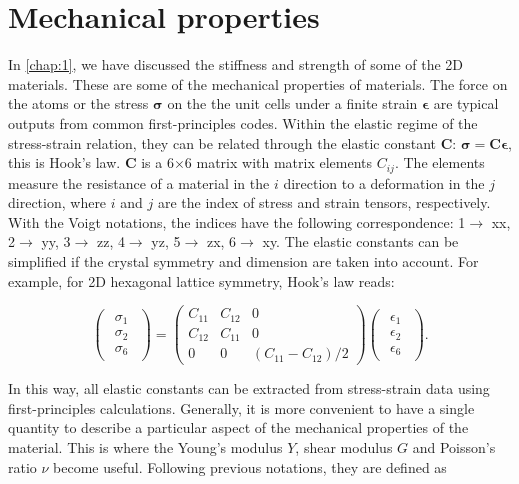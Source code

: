 \section{Mechanical properties}

In \autoref{chap:1}, we have discussed the stiffness and strength of some of the 2D materials. These are some of the mechanical properties of materials. The force on the atoms or the stress $\boldsymbol{\sigma}$ on the the unit cells under a finite strain $\boldsymbol{\epsilon}$ are typical outputs from common first-principles codes. Within the elastic regime of the stress-strain relation, they can be related through the elastic constant $\boldsymbol{C}$: $\boldsymbol{\sigma}=\boldsymbol{C}\boldsymbol{\epsilon}$, this is Hook's law. $\boldsymbol{C}$ is a 6$\times$6 matrix with matrix elements $C_{ij}$. The elements measure the resistance of a material in the $i$ direction to a deformation in the $j$ direction, where $i$ and $j$ are the index of stress and strain tensors, respectively.  With the Voigt notations, the indices have the following correspondence: 1$\rightarrow$ xx, 2$\rightarrow$ yy, 3$\rightarrow$ zz, 4$\rightarrow$ yz, 5$\rightarrow$ zx, 6$\rightarrow$ xy. The elastic constants can be simplified if the crystal symmetry and dimension are taken into account. For example, for 2D hexagonal lattice symmetry, Hook's law reads:

\begin{equation}
\begin{pmatrix} \begin{array}{c} \sigma_1 \\ \sigma_2 \\ \sigma_6 \end{array} 
\end{pmatrix}
=
 \begin{pmatrix}
  C_{11} & C_{12} & 0  \\
  C_{12} & C_{11} & 0  \\
  0 & 0 & (C_{11}-C_{12})/2
 \end{pmatrix}
 \begin{pmatrix} \begin{array}{c} \epsilon_1 \\ \epsilon_2 \\ \epsilon_6 
\end{array} \end{pmatrix}.
\end{equation} 

In this way, all elastic constants can be extracted from stress-strain data using first-principles calculations. Generally, it is more convenient to have a single quantity to describe a particular aspect of the mechanical properties of the material. This is where the Young's modulus $Y$, shear modulus $G$ and Poisson's ratio $\nu$ become useful. Following previous notations, they are defined as 

